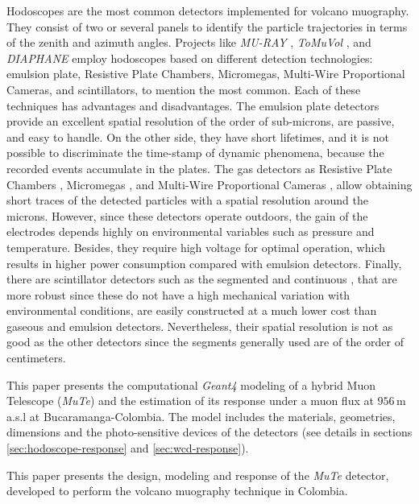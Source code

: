\documentclass[submitting]{nst}
\begin{document}
Hodoscopes are the most common detectors implemented for volcano muography.  They consist of two or several panels to identify the particle trajectories in terms of the zenith and azimuth angles. Projects like \textsl{MU-RAY} \cite{AnastasioEtal2013}, \textsl{ToMuVol} \cite{CarloganuEtal2013}, and \textsl{DIAPHANE} \cite{LesparreEtal2010} employ hodoscopes based on different detection technologies: emulsion plate, Resistive Plate Chambers, Micromegas, Multi-Wire Proportional Cameras, and scintillators, to mention the most common. Each of these techniques has advantages and disadvantages. The emulsion plate detectors \cite{MorishimaEtal2017, Nagamine2016} provide an excellent spatial resolution of the order of sub-microns, are passive, and easy to handle. On the other side, they have short lifetimes, and it is not possible to discriminate the time-stamp of dynamic phenomena, because the recorded events accumulate in the plates. The gas detectors as Resistive Plate Chambers \cite{SehgalEtal2016, Fehr2012}, Micromegas \cite{BouteilleEtal2016}, and Multi-Wire Proportional Cameras \cite{OlahEtal2018}, allow obtaining short traces of the detected particles with a spatial resolution around the microns. However, since these detectors operate outdoors, the gain of the electrodes depends highly on environmental variables such as pressure and temperature. Besides, they require high voltage for optimal operation, which results in higher power consumption compared with emulsion detectors. Finally, there are scintillator detectors such as the segmented \cite{FujiiEtal2013, LesparreEtal2012, TanakaEtal2009} and continuous \cite{NagamineEtal1995, AguiarEtal2015, TangEtal2016},  that are more robust since these do not have a high mechanical variation with environmental conditions, are easily constructed at a much lower cost than gaseous and emulsion detectors. Nevertheless, their spatial resolution is not as good as the other detectors since the segments generally used are of the order of centimeters.

This paper presents the computational \textsl{Geant4} modeling of a hybrid Muon Telescope (\textsl{MuTe}) and the estimation of its response under a muon flux at $956$\,m a.s.l at Bucaramanga-Colombia. The model includes the materials, geometries, dimensions and the photo-sensitive devices of the detectors (see details in sections \ref{sec:hodoscope-response} and \ref{sec:wcd-response}). 

This paper presents the design, modeling and response of the \textsl{MuTe} detector, developed to perform the volcano muography technique in Colombia.
\end{document}
